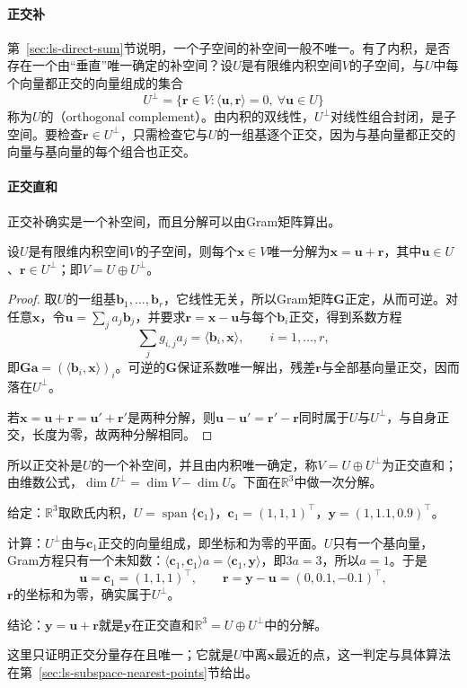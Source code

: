 \paragraph{正交补}
第~\ref{sec:ls-direct-sum}节说明，一个子空间的补空间一般不唯一。有了内积，是否存在一个由“垂直”唯一确定的补空间？设$U$是有限维内积空间$V$的子空间，与$U$中每个向量都正交的向量组成的集合
\[
 U^\perp=\{\bm r\in V:\langle\bm u,\bm r\rangle=0,\ \forall\bm u\in U\}
\]
称为$U$的（orthogonal complement）。由内积的双线性，$U^\perp$对线性组合封闭，是子空间。要检查$\bm r\in U^\perp$，只需检查它与$U$的一组基逐个正交，因为与基向量都正交的向量与基向量的每个组合也正交。

\paragraph{正交直和}
正交补确实是一个补空间，而且分解可以由Gram矩阵算出。
\begin{lemma}[正交直和]
\label{lem:ls-orthogonal-decomposition}
设$U$是有限维内积空间$V$的子空间，则每个$\bm x\in V$唯一分解为$\bm x=\bm u+\bm r$，其中$\bm u\in U$、$\bm r\in U^\perp$；即$V=U\oplus U^\perp$。
\end{lemma}
\begin{proof}
取$U$的一组基$\bm b_1,\ldots,\bm b_r$，它线性无关，所以Gram矩阵$\bm G$正定，从而可逆。对任意$\bm x$，令$\bm u=\sum_j a_j\bm b_j$，并要求$\bm r=\bm x-\bm u$与每个$\bm b_i$正交，得到系数方程
\[
 \sum_j g_{i,j}a_j=\langle\bm b_i,\bm x\rangle,\qquad i=1,\ldots,r,
\]
即$\bm G\bm a=(\langle\bm b_i,\bm x\rangle)_i$。可逆的$\bm G$保证系数唯一解出，残差$\bm r$与全部基向量正交，因而落在$U^\perp$。

若$\bm x=\bm u+\bm r=\bm u'+\bm r'$是两种分解，则$\bm u-\bm u'=\bm r'-\bm r$同时属于$U$与$U^\perp$，与自身正交，长度为零，故两种分解相同。
\end{proof}
所以正交补是$U$的一个补空间，并且由内积唯一确定，称$V=U\oplus U^\perp$为正交直和；由维数公式，$\dim U^\perp=\dim V-\dim U$。下面在$\mathbb R^3$中做一次分解。
\begin{example}[向一条直线的正交分解]
\label{ex:ls-orthogonal-decomposition-line}
给定：$\mathbb R^3$取欧氏内积，$U=\operatorname{span}\{\bm c_1\}$，$\bm c_1=(1,1,1)^\top$，$\bm y=(1,1.1,0.9)^\top$。

计算：$U^\perp$由与$\bm c_1$正交的向量组成，即坐标和为零的平面。$U$只有一个基向量，Gram方程只有一个未知数：$\langle\bm c_1,\bm c_1\rangle a=\langle\bm c_1,\bm y\rangle$，即$3a=3$，所以$a=1$。于是
\[
 \bm u=\bm c_1=(1,1,1)^\top,
 \qquad
 \bm r=\bm y-\bm u=(0,0.1,-0.1)^\top,
\]
$\bm r$的坐标和为零，确实属于$U^\perp$。

结论：$\bm y=\bm u+\bm r$就是$\bm y$在正交直和$\mathbb R^3=U\oplus U^\perp$中的分解。
\end{example}
这里只证明正交分量存在且唯一；它就是$U$中离$\bm x$最近的点，这一判定与具体算法在第~\ref{sec:ls-subspace-nearest-points}节给出。

